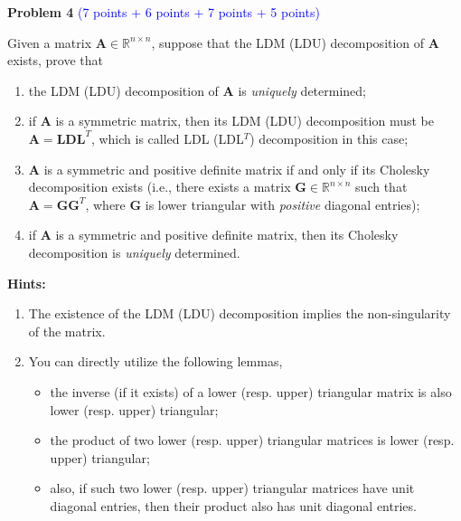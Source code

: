 \documentclass[english,onecolumn]{IEEEtran}
\begin{document}
\newpage
\noindent\textbf{Problem 4} \textcolor{blue}{(7 points + 6 points + 7 points + 5 points)}

\noindent Given a matrix $\mathbf{A}\in\mathbb{R}^{n\times n}$, suppose that the LDM (LDU) decomposition of $\mathbf{A}$ exists, prove that
\begin{enumerate}
	\item the LDM (LDU) decomposition of $\mathbf{A}$ is \textit{uniquely} determined;
	\item if $\mathbf{A}$ is a symmetric matrix, then its LDM (LDU) decomposition must be $\mathbf{A}=\mathbf{L}\mathbf{D}\mathbf{L}^T$, which is called LDL (LDL$^T$) decomposition in this case;
	\item $\mathbf{A}$ is a symmetric and positive definite matrix if and only if its Cholesky decomposition exists (i.e., there exists a matrix $\mathbf{G}\in\mathbb{R}^{n\times n}$ such that $\mathbf{A}=\mathbf{G}\mathbf{G}^T$, where $\mathbf{G}$ is lower triangular with \textit{positive} diagonal entries);
	\item if $\mathbf{A}$ is a symmetric and positive definite matrix, then its Cholesky decomposition is \textit{uniquely} determined.	
\end{enumerate}

\textbf{Hints:}  
\begin{enumerate}
    \item The existence of the LDM (LDU) decomposition implies the non-singularity of the matrix.
    \item You can directly utilize the following lemmas,
\begin{itemize}
    \item the inverse (if it exists) of a lower (resp. upper) triangular matrix is also lower (resp. upper) triangular;
    \item the product of two lower (resp. upper) triangular matrices is lower (resp. upper) triangular;
    \item also, if such two lower (resp. upper) triangular matrices have unit diagonal entries, then their product also has unit diagonal entries.
\end{itemize}
\end{enumerate}

  
\end{document}
